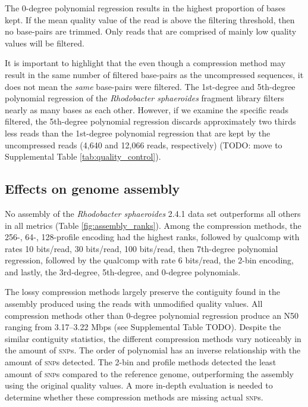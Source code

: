 The 0-degree polynomial regression results in the highest proportion
of bases kept. If the mean quality value of the read is above
the filtering threshold, then no base-pairs are trimmed. Only
reads that are comprised of mainly low quality values will be
filtered.

It is important to highlight that the even though a compression method
may result in the same number of filtered base-pairs as the
uncompressed sequences, it does not mean the \emph{same} base-pairs
were filtered. The 1st-degree and 5th-degree polynomial regression of
the \textit{Rhodobacter sphaeroides} fragment library filters nearly
as many bases as each other. However, if we examine the specific
reads filtered, the 5th-degree polynomial regression discards
approximately two thirds less reads than the 1st-degree polynomial
regression that are kept by the uncompressed reads (4,640 and
12,066 reads, respectively) (TODO: move to Supplemental Table
\ref{tab:quality_control}).

\subsection{Effects on genome assembly}

No assembly of the \textit{Rhodobacter sphaeroides} 2.4.1 data set
outperforms all others in all metrics (Table
\ref{fig:assembly_ranks}).
Among the compression methods, the 256-, 64-, 128-profile encoding had
the highest ranks, followed by \textsc{q}ual\textsc{c}omp with rates 10 bits/read, 30
bits/read, 100 bits/read, then 7th-degree polynomial regression,
followed by the \textsc{q}ual\textsc{c}omp with rate 6 bits/read, the 2-bin encoding,
and lastly, the 3rd-degree, 5th-degree, and 0-degree polynomials.

The lossy compression methods largely preserve the contiguity found in
the assembly produced using the reads with unmodified quality
values. All compression methods other than 0-degree polynomial
regression produce an N50 ranging from 3.17--3.22 Mbps (see
Supplemental Table TODO). Despite the similar contiguity statistics,
the different compression methods vary noticeably in the amount of
\textsc{snp}s. The order of polynomial has an inverse relationship
with the amount of \textsc{snp}s detected. The 2-bin and profile
methods detected the least amount of \textsc{snp}s compared to the
reference genome, outperforming the assembly using the original
quality values. A more in-depth evaluation is needed to determine
whether these compression methods are missing actual \textsc{snp}s.

